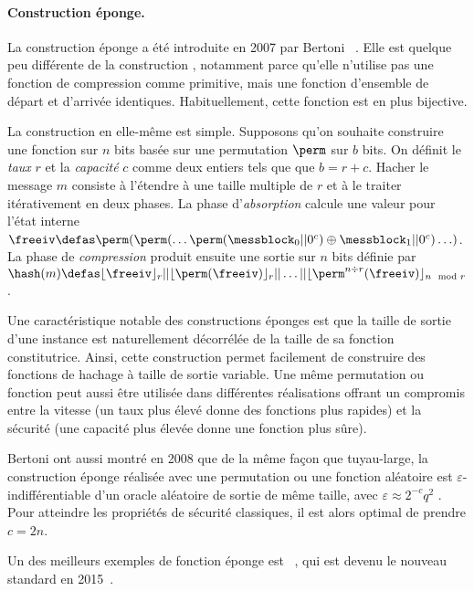 \paragraph{Construction éponge.} La construction éponge a été introduite en 2007 par
Bertoni \etal~\cite{SpongeFunctions}.
Elle est quelque peu différente de la construction \merkdam, notamment parce qu'elle n'utilise pas une fonction de compression
comme primitive, mais une fonction d'ensemble de départ et d'arrivée identiques. Habituellement, cette fonction est en plus bijective.

La construction en elle-même est simple. Supposons qu'on souhaite construire une fonction sur $n$ bits basée sur une permutation $\perm$ sur $b$ bits.
On définit le \emph{taux} $r$ et la \emph{capacité} $c$ comme deux entiers tels que que $b = r + c$.
Hacher le message
$m$ consiste à
l'étendre à une taille multiple de $r$ et à le traiter itérativement en deux phases.
La phase d'\emph{absorption} calcule une valeur pour l'état interne
$\freeiv \defas \perm(\perm(\ldots\perm(\messblock_0||0^c)\oplus\messblock_1||0^c)\ldots)$. La phase de \emph{compression} produit ensuite une sortie sur $n$ bits définie par
$\hash(m) \defas \lfloor\freeiv\rfloor_r||\lfloor\perm(\freeiv)\rfloor_r||\ldots||\lfloor\perm^{n \div r}(\freeiv)\rfloor_{n \mod r}$.

Une caractéristique notable des constructions éponges est que la taille de sortie d'une instance
est naturellement décorrélée de la taille de sa fonction constitutrice. Ainsi, cette construction permet facilement de construire des fonctions de hachage à
taille de sortie
variable. Une même permutation ou fonction peut aussi être utilisée dans différentes réalisations offrant un compromis entre la vitesse
(un taux plus élevé donne des fonctions plus rapides) et la sécurité (une capacité plus élevée donne une fonction plus sûre).

Bertoni \etal ont aussi montré en 2008 que de la même façon que \merkdam tuyau-large, la construction éponge réalisée avec une permutation ou une fonction aléatoire est
$\varepsilon$-indifférentiable d'un oracle aléatoire de sortie de même taille,
avec $\varepsilon \approx 2^{-c}q^2$ \cite{DBLP:conf/eurocrypt/BertoniDPA08}. Pour atteindre les propriétés de sécurité classiques, il est alors
optimal de prendre $c = 2n$.

Un des meilleurs exemples de fonction éponge est
\keccak~\cite{KeccakReference}, qui est devenu le nouveau standard \shathree en 2015~\cite{Nist-SHA3}.

